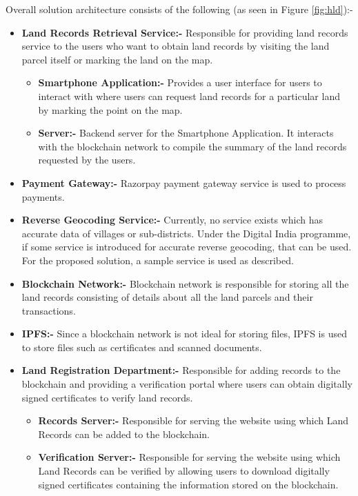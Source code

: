 \documentclass{article}
\begin{document}
    Overall solution architecture consists of the following (as seen in Figure \ref{fig:hld}):-
    \begin{itemize}
        \item \textbf{Land Records Retrieval Service:-} Responsible for providing land records service to the users who want to obtain land records by visiting the land parcel itself or marking the land on the map.
        \begin{itemize}
            \item \textbf{Smartphone Application:-} Provides a user interface for users to interact with where users can request land records for a particular land by marking the point on the map.
            \item \textbf{Server:-} Backend server for the Smartphone Application. It interacts with the blockchain network to compile the summary of the land records requested by the users.
        \end{itemize}
        \item \textbf{Payment Gateway:-} Razorpay payment gateway service is used to process payments.
        \item \textbf{Reverse Geocoding Service:-} Currently, no service exists which has accurate data of villages or sub-districts. Under the Digital India programme, if some service is introduced for accurate reverse geocoding, that can be used. For the proposed solution, a sample service is used as described.
        \item \textbf{Blockchain Network:-} Blockchain network is responsible for storing all the land records consisting of details about all the land parcels and their transactions.
        \item \textbf{IPFS:-} Since a blockchain network is not ideal for storing files, IPFS is used to store files such as certificates and scanned documents.
        \item \textbf{Land Registration Department:-} Responsible for adding records to the blockchain and providing a verification portal where users can obtain digitally signed certificates to verify land records.
        \begin{itemize}
            \item \textbf{Records Server:-} Responsible for serving the website using which Land Records can be added to the blockchain.
            \item \textbf{Verification Server:-} Responsible for serving the website using which Land Records can be verified by allowing users to download digitally signed certificates containing the information stored on the blockchain.
        \end{itemize}  
    \end{itemize}
\end{document}
